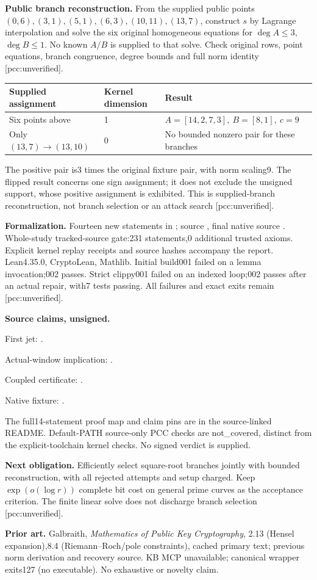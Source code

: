 \documentclass[11pt]{article}
\begin{document}
\textbf{Public branch reconstruction.} From the supplied public points
$(0,6),(3,1),(5,1),(6,3),(10,11),(13,7)$, construct $s$ by Lagrange interpolation
and solve the six original homogeneous equations for $\deg A\le3$, $\deg B\le1$.
No known $A/B$ is supplied to that solve. Check original rows, point equations,
branch congruence, degree bounds and full norm identity [pcc:unverified].
\begin{center}\small
\begin{tabular}{lll}
Supplied assignment & Kernel dimension & Result\\\hline
Six points above &1&$A=[14,2,7,3],\ B=[8,1],\ c=9$\\
Only $(13,7)\to(13,10)$ &0&No bounded nonzero pair for these branches
\end{tabular}
\end{center}
The positive pair is3 times the original fixture pair, with norm scaling9.
The flipped result concerns one sign assignment; it does not exclude the
unsigned support, whose positive assignment is exhibited. This is supplied-branch
reconstruction, not branch selection or an attack search [pcc:unverified].

\textbf{Formalization.} Fourteen new statements in ;
source , final native source . Whole-study
tracked-source gate:231 statements,0 additional trusted axioms. Explicit
kernel replay receipts and source hashes accompany the report. Lean4.35.0,
CryptoLean, Mathlib. Initial build001
failed on a lemma invocation;002 passes. Strict clippy001 failed on an indexed
loop;002 passes after an actual repair, with7 tests passing. All failures and
exact exits remain [pcc:unverified].

\textbf{Source claims, unsigned.}\par
First jet: .\par
Actual-window implication: .\par
Coupled certificate: .\par
Native fixture: .\par
The full14-statement proof map and claim pins are in the source-linked README.
Default-PATH source-only PCC checks are not\_covered, distinct from the
explicit-toolchain kernel checks. No signed verdict is supplied.

\textbf{Next obligation.} Efficiently select square-root branches jointly with
bounded reconstruction, with all rejected attempts and setup charged. Keep
$\exp(o(\log r))$ complete bit cost on general prime curves as the acceptance
criterion. The finite linear solve does not discharge branch selection
[pcc:unverified].

\textbf{Prior art.} Galbraith, \emph{Mathematics of Public Key Cryptography},
2.13 (Hensel expansion),8.4 (Riemann--Roch/pole constraints), cached primary
text; previous norm derivation and recovery source. KB MCP unavailable;
canonical wrapper exits127 (no executable). No exhaustive or novelty claim.
\end{document}
